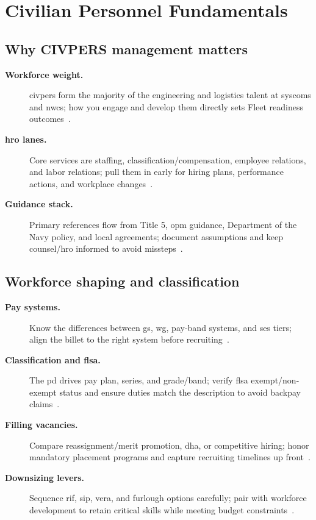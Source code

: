 \documentclass[../main.tex]{subfiles}
\begin{document}

\section{Civilian Personnel Fundamentals}

\subsection{Why CIVPERS management matters}
\begin{description}
  \item[\textbf{Workforce weight.}] \ac{civpers} form the majority of the engineering and logistics talent at \acp{syscom} and \acp{nwc}; how you engage and develop them directly sets Fleet readiness outcomes~\autocite{edo-6-1-1-civpers-overview-2024}.
  \item[\textbf{\ac{hro} lanes.}] Core services are staffing, classification/compensation, employee relations, and labor relations; pull them in early for hiring plans, performance actions, and workplace changes~\autocite{edo-6-1-1-civpers-overview-2024}.
  \item[\textbf{Guidance stack.}] Primary references flow from Title 5, \ac{opm} guidance, Department of the Navy policy, and local agreements; document assumptions and keep counsel/\ac{hro} informed to avoid missteps~\autocite{edo-6-1-1-civpers-overview-2024}.
\end{description}

\subsection{Workforce shaping and classification}
\begin{description}
  \item[\textbf{Pay systems.}] Know the differences between \ac{gs}, \ac{wg}, pay-band systems, and \ac{ses} tiers; align the billet to the right system before recruiting~\autocite{edo-6-1-2-workforce-shaping-2025}.
  \item[\textbf{Classification and \ac{flsa}.}] The \ac{pd} drives pay plan, series, and grade/band; verify \ac{flsa} exempt/non-exempt status and ensure duties match the description to avoid backpay claims~\autocite{edo-6-1-2-workforce-shaping-2025}.
  \item[\textbf{Filling vacancies.}] Compare reassignment/merit promotion, \ac{dha}, or competitive hiring; honor mandatory placement programs and capture recruiting timelines up front~\autocite{edo-6-1-2-workforce-shaping-2025}.
  \item[\textbf{Downsizing levers.}] Sequence \ac{rif}, \ac{sip}, \ac{vera}, and furlough options carefully; pair with workforce development to retain critical skills while meeting budget constraints~\autocite{edo-6-1-2-workforce-shaping-2025}.
\end{description}
\end{document}

